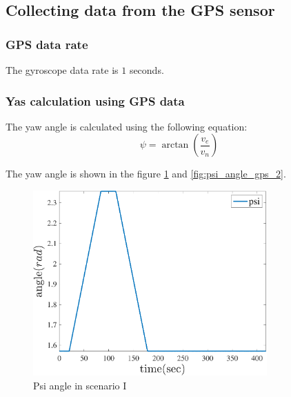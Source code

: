 \subsection{Collecting data from the GPS sensor}
\subsubsection{GPS data rate}
The gyroscope data rate is $1$ seconds.

\subsubsection{Yas calculation using GPS data}
The yaw angle is calculated using the following equation:
\begin{equation}
  \psi = \arctan{\left(\dfrac{v_e}{v_n}\right)}
\end{equation}

The yaw angle is shown in the figure \ref{fig:psi_angle_gps} and \ref{fig:psi_angle_gps_2}.
\begin{figure}[H]
  \centering
  \includegraphics[width=0.8\textwidth]{../Figure/Q1/psi_3}
  \caption{Psi angle in scenario I}
  \label{fig:psi_angle_gps}
\end{figure}

